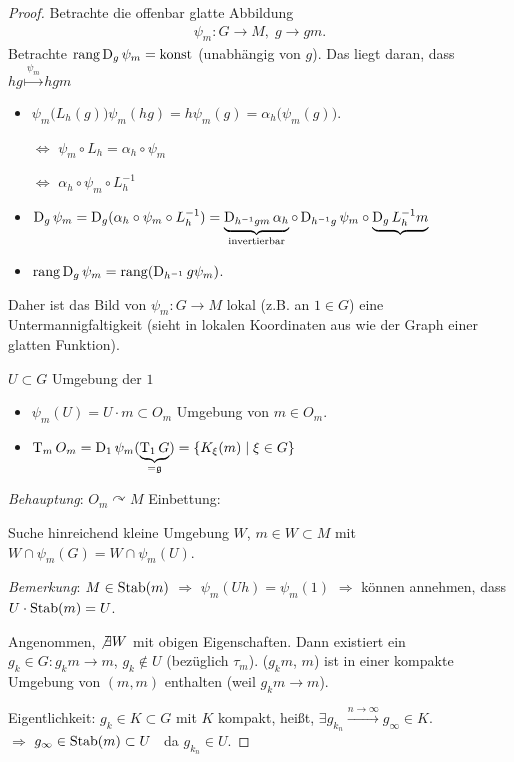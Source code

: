 \begin{proof}
	Betrachte die offenbar glatte Abbildung \begin{align*}
		\psi_m\colon G\to M,\;g\to gm.
	\end{align*}
	Betrachte $\operatorname{rang} \operatorname{D}_g \psi_m = \mathrm{konst}$ (unabhängig von $g$).
	Das liegt daran, dass $hg\overset{\psi_m}\mapsto hgm$
	\begin{itemize}[label={$\Rightarrow$},topsep=-0.25\baselineskip,itemsep=0pt]
		\item  $\psi_m\big(L_h(g)\big)\psi_m(hg) = h\psi_m(g) = \alpha_h\big(\psi_m(g)\big)$.
		\item[$\Leftrightarrow$] $\psi_m\circ L_h = \alpha_h \circ\psi_m$
		\item[$\Leftrightarrow$] $\alpha_h\circ\psi_m\circ L_h^{-1}$
		\item $\operatorname{D}_g \psi_m = \operatorname{D}_g(\alpha_h\circ \psi_m\circ L_h^{-1}) = \underbrace{\operatorname{D}_{h^{-1}gm} \alpha_h}_{\text{invertierbar}} \circ \operatorname{D}_{h^{-1}g}\psi_m\circ \underbrace{\operatorname{D}_g L^{-1}_{h}m}$
		\item $\operatorname{rang} \operatorname{D}_g \psi_m = \operatorname{rang}(\operatorname{D}_{h^{-1}}g \psi_m)$.
	\end{itemize}
	Daher ist das Bild von $\psi_m\colon G\to M$ lokal (z.B. an $1\in G$) eine Untermannigfaltigkeit (sieht in lokalen Koordinaten aus wie der Graph einer glatten Funktion).
	
	$U\subset G$ Umgebung der $1$\begin{itemize}[label={$\Rightarrow$},topsep=-0.25\baselineskip,itemsep=0pt]
		\item $\psi_m(U) = U\cdot m\subset O_m$ Umgebung von $m\in O_m$.
		\item $\operatorname{T}_m O_m = \operatorname{D}_1 \psi_m (\underbrace{\operatorname{T}_1 G}_{=\mathfrak g}) = \{ K_\xi (m)\mid\xi\in G \}$
	\end{itemize}

	\emph{Behauptung}: $O_m\curvearrowright M$ Einbettung:
	
	Suche hinreichend kleine Umgebung $W$, $m\in W\subset M$ mit $W\cap\psi_m(G) = W\cap\psi_m(U)$.
	
	\emph{Bemerkung}: $M\in\operatorname{Stab}(m)$ $\Rightarrow$ $\psi_m(Uh) = \psi_m(1)$ $\Rightarrow$ können annehmen, dass $U\cdot\operatorname{Stab}(m) = U$.
	
	Angenommen, $\not\exists W$ mit obigen Eigenschaften. Dann existiert ein $g_k\in G\colon g_k m\to m$, $g_k\notin U$ (bezüglich $\tau_m$). ($g_k m$, $m$) ist in einer kompakte Umgebung von $(m,m)$ enthalten (weil $g_k m\to m$).
	
	Eigentlichkeit: $g_k\in K\subset G$ mit $K$ kompakt, heißt, $\exists g_{k_n} \xrightarrow{n\to\infty} g_\infty \in K$.\\
	\hspace*{0.5em}$\Rightarrow$ $g_\infty\in\operatorname{Stab}(m)\subset U$ \Lightning~da $g_{k_n}\in U$.
\end{proof}
